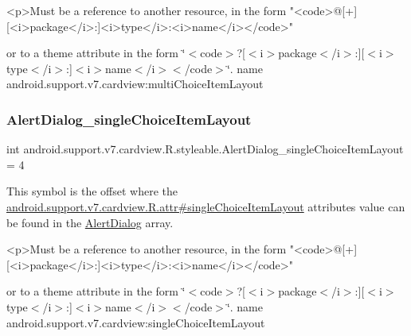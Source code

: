 \begin{DoxyVerb}      <p>Must be a reference to another resource, in the form "<code>@[+][<i>package</i>:]<i>type</i>:<i>name</i></code>"
\end{DoxyVerb}
 or to a theme attribute in the form \char`\"{}$<$code$>$?\mbox{[}$<$i$>$package$<$/i$>$\+:\mbox{]}\mbox{[}$<$i$>$type$<$/i$>$\+:\mbox{]}$<$i$>$name$<$/i$>$$<$/code$>$\char`\"{}.  name android.\+support.\+v7.\+cardview\+:multi\+Choice\+Item\+Layout \mbox{\label{classandroid_1_1support_1_1v7_1_1cardview_1_1R_1_1styleable_a0203543b0366663e4ea18dd225ce00cb}} 
\subsubsection{\texorpdfstring{Alert\+Dialog\+\_\+single\+Choice\+Item\+Layout}{AlertDialog\_singleChoiceItemLayout}}
{\footnotesize\ttfamily int android.\+support.\+v7.\+cardview.\+R.\+styleable.\+Alert\+Dialog\+\_\+single\+Choice\+Item\+Layout = 4\hspace{0.3cm}{\ttfamily [static]}}

This symbol is the offset where the \hyperlink{classandroid_1_1support_1_1v7_1_1cardview_1_1R_1_1attr_a02adf6c7fe6e46d761997a19ab266467}{android.\+support.\+v7.\+cardview.\+R.\+attr\#single\+Choice\+Item\+Layout} attribute\textquotesingle{}s value can be found in the \hyperlink{classandroid_1_1support_1_1v7_1_1cardview_1_1R_1_1styleable_a44fc620801e3af4c8b4e7ef1fee84a2d}{Alert\+Dialog} array.

\begin{DoxyVerb}      <p>Must be a reference to another resource, in the form "<code>@[+][<i>package</i>:]<i>type</i>:<i>name</i></code>"
\end{DoxyVerb}
 or to a theme attribute in the form \char`\"{}$<$code$>$?\mbox{[}$<$i$>$package$<$/i$>$\+:\mbox{]}\mbox{[}$<$i$>$type$<$/i$>$\+:\mbox{]}$<$i$>$name$<$/i$>$$<$/code$>$\char`\"{}.  name android.\+support.\+v7.\+cardview\+:single\+Choice\+Item\+Layout \mbox{\label{classandroid_1_1support_1_1v7_1_1cardview_1_1R_1_1styleable_ab9fe56d8bb5990d833de044115d0edbe}} 
